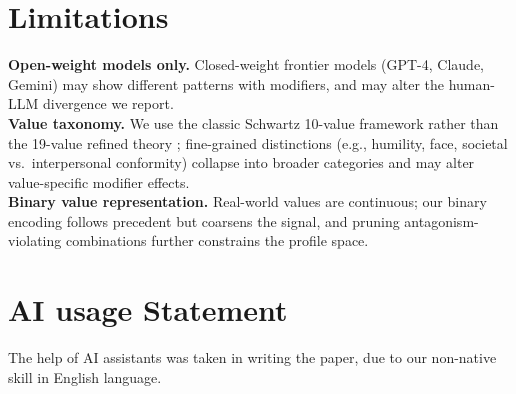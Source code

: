 \documentclass[11pt]{article}
\begin{document}


\section*{Limitations}
\label{sec:limitations}
\textbf{Open-weight models only.} Closed-weight frontier models (GPT-4, Claude, Gemini) may show different patterns with modifiers, and may alter the human-LLM divergence we report.\\[2pt]
\textbf{Value taxonomy.} We use the classic Schwartz 10-value framework rather than the 19-value refined theory \citep{schwartz2012refined}; fine-grained distinctions (e.g., humility, face, societal vs.\ interpersonal conformity) collapse into broader categories and may alter value-specific modifier effects.\\[2pt]
\textbf{Binary value representation.} Real-world values are continuous; our binary encoding follows precedent \citep{sorensen2024value} but coarsens the signal, and pruning antagonism-violating combinations further constrains the profile space.

\section*{AI usage Statement}
The help of AI assistants was taken in writing the paper, due to our non-native skill in English language.
\end{document}
